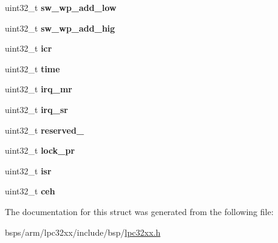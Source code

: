 \begin{DoxyCompactItemize}
\item 
\mbox{\label{structlpc32xx__nand__mlc_aeb66a58179471cb33a20569745a10bfd}} 
uint32\+\_\+t {\bfseries sw\+\_\+wp\+\_\+add\+\_\+low}
\item 
\mbox{\label{structlpc32xx__nand__mlc_ae24e852aedfde9754e56bdfe3bc5a8aa}} 
uint32\+\_\+t {\bfseries sw\+\_\+wp\+\_\+add\+\_\+hig}
\item 
\mbox{\label{structlpc32xx__nand__mlc_a476dec30836c2b6df8a8f616f1f48424}} 
uint32\+\_\+t {\bfseries icr}
\item 
\mbox{\label{structlpc32xx__nand__mlc_aa4261a366d0c03a4c449652bf7d61968}} 
uint32\+\_\+t {\bfseries time}
\item 
\mbox{\label{structlpc32xx__nand__mlc_adede8e40723fad524916d97b31169f30}} 
uint32\+\_\+t {\bfseries irq\+\_\+mr}
\item 
\mbox{\label{structlpc32xx__nand__mlc_a17b22d82558744dbe26e448a4051b9c4}} 
uint32\+\_\+t {\bfseries irq\+\_\+sr}
\item 
\mbox{\label{structlpc32xx__nand__mlc_a223eb98fab388ac3e967468dbfa11529}} 
uint32\+\_\+t {\bfseries reserved\+\_}
\item 
\mbox{\label{structlpc32xx__nand__mlc_a01d104927af87d92b6cad11f1999e871}} 
uint32\+\_\+t {\bfseries lock\+\_\+pr}
\item 
\mbox{\label{structlpc32xx__nand__mlc_a51c216a470a30ac1ba2799a465ec48ee}} 
uint32\+\_\+t {\bfseries isr}
\item 
\mbox{\label{structlpc32xx__nand__mlc_a5611a2dc55ef0828b1f19acf9f3900fa}} 
uint32\+\_\+t {\bfseries ceh}
\end{DoxyCompactItemize}


The documentation for this struct was generated from the following file\+:\begin{DoxyCompactItemize}
\item 
bsps/arm/lpc32xx/include/bsp/\mbox{\hyperlink{lpc32xx_8h}{lpc32xx.\+h}}\end{DoxyCompactItemize}
